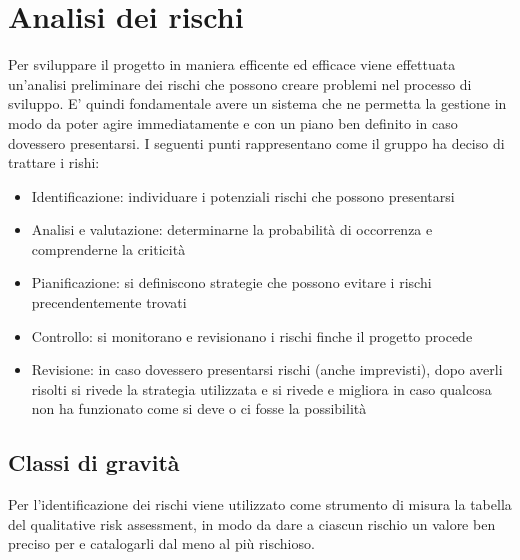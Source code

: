 \newpage
\section{Analisi dei rischi} \label{AnalisiDeiRischi}
	
	Per sviluppare il progetto in maniera efficente ed efficace viene effettuata un'analisi preliminare dei rischi che possono creare problemi nel processo di sviluppo.
	E' quindi fondamentale avere un sistema che ne permetta la gestione in modo da poter agire immediatamente e con un piano ben definito in caso dovessero presentarsi.
	I seguenti punti rappresentano come il gruppo ha deciso di trattare i rishi:
	
	\begin{itemize}
		\item Identificazione: individuare i potenziali rischi che possono presentarsi
		\item Analisi e valutazione: determinarne la probabilità di occorrenza e comprenderne la criticità
		\item Pianificazione: si definiscono strategie che possono evitare i rischi precendentemente trovati
		\item Controllo: si monitorano e revisionano i rischi finche il progetto procede 
		\item Revisione: in caso dovessero presentarsi rischi (anche imprevisti), dopo averli risolti si rivede la strategia utilizzata e si rivede e migliora in caso qualcosa non ha funzionato come si deve o ci fosse la possibilità
	\end{itemize}
	
	\subsection{Classi di gravità}
	
	Per l'identificazione dei rischi viene utilizzato come strumento di misura la tabella del qualitative risk assessment, in modo da dare a ciascun rischio un valore ben preciso per e catalogarli dal meno al più rischioso.
	
